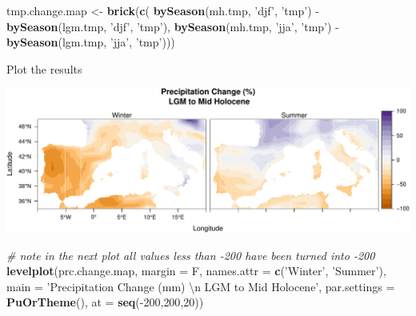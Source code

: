\documentclass[11pt,]{tufte-handout}
\newenvironment{Shaded}{}{}
\newcommand{\KeywordTok}[1]{\textcolor[rgb]{0.00,0.44,0.13}{\textbf{{#1}}}}
\newcommand{\DataTypeTok}[1]{\textcolor[rgb]{0.56,0.13,0.00}{{#1}}}
\newcommand{\DecValTok}[1]{\textcolor[rgb]{0.25,0.63,0.44}{{#1}}}
\newcommand{\CharTok}[1]{\textcolor[rgb]{0.25,0.44,0.63}{{#1}}}
\newcommand{\StringTok}[1]{\textcolor[rgb]{0.25,0.44,0.63}{{#1}}}
\newcommand{\CommentTok}[1]{\textcolor[rgb]{0.38,0.63,0.69}{\textit{{#1}}}}
\newcommand{\NormalTok}[1]{{#1}}
\begin{document}
\begin{Shaded}
\begin{Highlighting}[]
\NormalTok{tmp.change.map <-}\StringTok{ }\KeywordTok{brick}\NormalTok{(}\KeywordTok{c}\NormalTok{(}
  \KeywordTok{bySeason}\NormalTok{(mh.tmp, }\StringTok{'djf'}\NormalTok{, }\StringTok{'tmp'}\NormalTok{) -}\StringTok{ }\KeywordTok{bySeason}\NormalTok{(lgm.tmp, }\StringTok{'djf'}\NormalTok{, }\StringTok{'tmp'}\NormalTok{),}
  \KeywordTok{bySeason}\NormalTok{(mh.tmp, }\StringTok{'jja'}\NormalTok{, }\StringTok{'tmp'}\NormalTok{) -}\StringTok{ }\KeywordTok{bySeason}\NormalTok{(lgm.tmp, }\StringTok{'jja'}\NormalTok{, }\StringTok{'tmp'}\NormalTok{)))}
\end{Highlighting}
\end{Shaded}

Plot the results

\begin{Shaded}
\end{Shaded}

\includegraphics{climate-analysis_files/figure-latex/unnamed-chunk-10-1}

\begin{Shaded}
\begin{Highlighting}[]
\CommentTok{# note in the next plot all values less than -200 have been turned into -200}
\KeywordTok{levelplot}\NormalTok{(prc.change.map, }\DataTypeTok{margin =} \NormalTok{F, }\DataTypeTok{names.attr =} \KeywordTok{c}\NormalTok{(}\StringTok{'Winter'}\NormalTok{, }\StringTok{'Summer'}\NormalTok{), }
          \DataTypeTok{main =} \StringTok{'Precipitation Change (mm) }\CharTok{\textbackslash{}n}\StringTok{ LGM to Mid Holocene'}\NormalTok{,}
          \DataTypeTok{par.settings =} \KeywordTok{PuOrTheme}\NormalTok{(), }
          \DataTypeTok{at =} \KeywordTok{seq}\NormalTok{(-}\DecValTok{200}\NormalTok{,}\DecValTok{200}\NormalTok{,}\DecValTok{20}\NormalTok{))    }
\end{Highlighting}
\end{Shaded}
\end{document}
